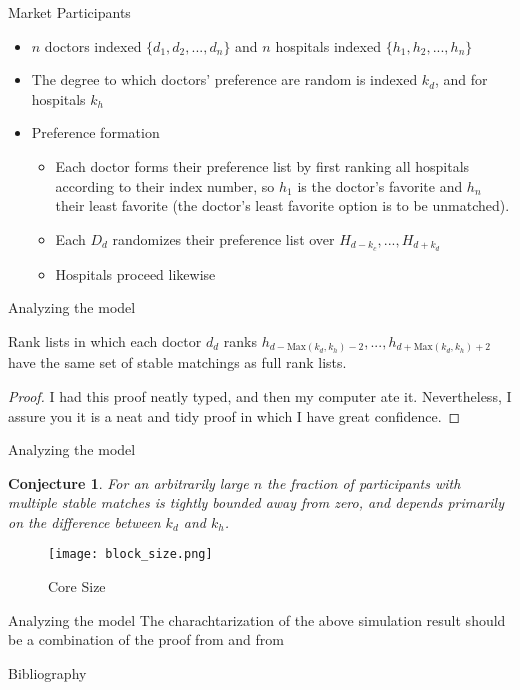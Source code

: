 \documentclass{beamer}
\newtheorem{conj}{Conjecture}
\begin{document}
\begin{frame}{Market Participants}
	
\begin{itemize}
	\item $n$ doctors  indexed $\{ d_1, d_2, ... ,d_n\}$ and  $n$ hospitals  indexed $\{ h_1, h_2, ... ,h_n\}$
	\item The degree to which doctors' preference are random is indexed $k_d$, and for hospitals $k_h$
	\item Preference formation
	\begin{itemize}
		\item Each doctor forms their preference list by first ranking all hospitals according to their index number, so $h_1$ is the doctor's favorite and $h_n$ their least favorite (the doctor's least favorite option is to be unmatched).  
		\item Each $D_d$ randomizes their preference list over $H_{d-k_c},...,H_{d+k_d}$
		\item Hospitals proceed likewise
	\end{itemize}
\end{itemize}
\end{frame}


\begin{frame}{Analyzing the model}
	
\begin{theorem}
    Rank lists in which each doctor $d_d$ ranks $h_{d-\text{Max}(k_d,k_h)-2}, ..., h_{d+\text{Max}(k_d,k_h)+2}$ have the same set of stable matchings as full rank lists. 
\end{theorem}
\begin{proof}
    I had this proof neatly typed, and then my computer ate it.  Nevertheless, I assure you it is a neat and tidy proof in which I have great confidence.
\end{proof}
\end{frame}
\begin{frame}{Analyzing the model}
	
	
	
\begin{conj}
    For an arbitrarily large $n$ the fraction of participants with multiple stable matches is tightly bounded away from zero, and depends primarily on the difference between $k_d$ and $k_h$.
\end{conj}
\begin{figure}
    \texttt{[image: block\_size.png]}
    \caption{Core Size}
  \end{figure}

\end{frame}

\begin{frame}{Analyzing the model}
    The charachtarization of the above simulation result should be a combination of the proof from \cite{Ashlagi2017} and from \cite{Immorlica2005}
\end{frame}

\begin{frame}{Bibliography}


\end{frame}
\end{document}
